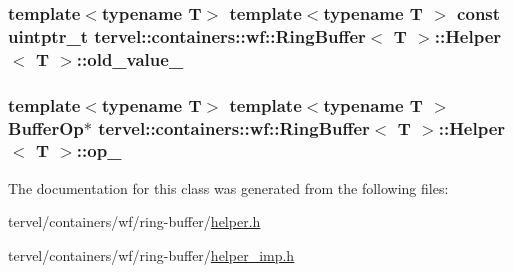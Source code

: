 \subsubsection[{old\+\_\+value\+\_\+}]{\setlength{\rightskip}{0pt plus 5cm}template$<$typename T$>$ template$<$typename T $>$ const uintptr\+\_\+t {\bf tervel\+::containers\+::wf\+::\+Ring\+Buffer}$<$ T $>$\+::{\bf Helper}$<$ T $>$\+::old\+\_\+value\+\_\+}\label{classtervel_1_1containers_1_1wf_1_1_ring_buffer_1_1_helper_a9669431287884c83f20afb6c16446a6c}
\hypertarget{classtervel_1_1containers_1_1wf_1_1_ring_buffer_1_1_helper_acdb1064476d7cbc7cc18492aa2a2d9ea}{}
\subsubsection[{op\+\_\+}]{\setlength{\rightskip}{0pt plus 5cm}template$<$typename T$>$ template$<$typename T $>$ {\bf Buffer\+Op}$\ast$ {\bf tervel\+::containers\+::wf\+::\+Ring\+Buffer}$<$ T $>$\+::{\bf Helper}$<$ T $>$\+::op\+\_\+}\label{classtervel_1_1containers_1_1wf_1_1_ring_buffer_1_1_helper_acdb1064476d7cbc7cc18492aa2a2d9ea}


The documentation for this class was generated from the following files\+:\begin{DoxyCompactItemize}
\item 
tervel/containers/wf/ring-\/buffer/\hyperlink{helper_8h}{helper.\+h}\item 
tervel/containers/wf/ring-\/buffer/\hyperlink{helper__imp_8h}{helper\+\_\+imp.\+h}\end{DoxyCompactItemize}
